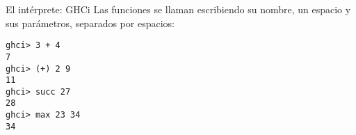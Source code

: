 \begin{frame}[fragile]{El intérprete: GHCi}
 Las funciones se llaman escribiendo su nombre, un espacio y sus parámetros, separados por espacios:
\espacio
  \begin{lstlisting}
ghci> 3 + 4
7
ghci> (+) 2 9
11
ghci> succ 27
28
ghci> max 23 34
34
  \end{lstlisting}

\end{frame}
